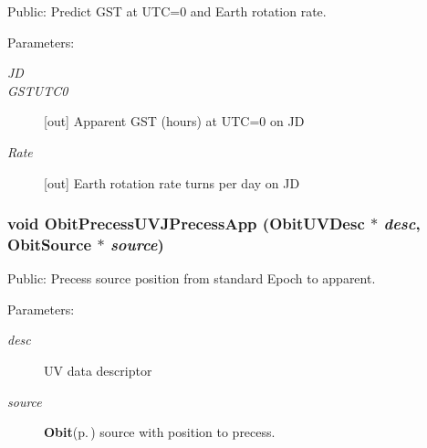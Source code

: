 Public: Predict GST at UTC=0 and Earth rotation rate. 

\begin{Desc}
\item[Parameters:]
\begin{description}
\item[{\em JD}]\item[{\em GSTUTC0}][out] Apparent GST (hours) at UTC=0 on JD \item[{\em Rate}][out] Earth rotation rate turns per day on JD \end{description}
\end{Desc}
\subsubsection{\setlength{\rightskip}{0pt plus 5cm}void Obit\-Precess\-UVJPrecess\-App ({\bf Obit\-UVDesc} $\ast$ {\em desc}, {\bf Obit\-Source} $\ast$ {\em source})}\label{ObitPrecess_8c_a6}


Public: Precess source position from standard Epoch to apparent. 

\begin{Desc}
\item[Parameters:]
\begin{description}
\item[{\em desc}]UV data descriptor \item[{\em source}]{\bf Obit}{\rm (p.\,\pageref{structObit})} source with position to precess. \end{description}
\end{Desc}
